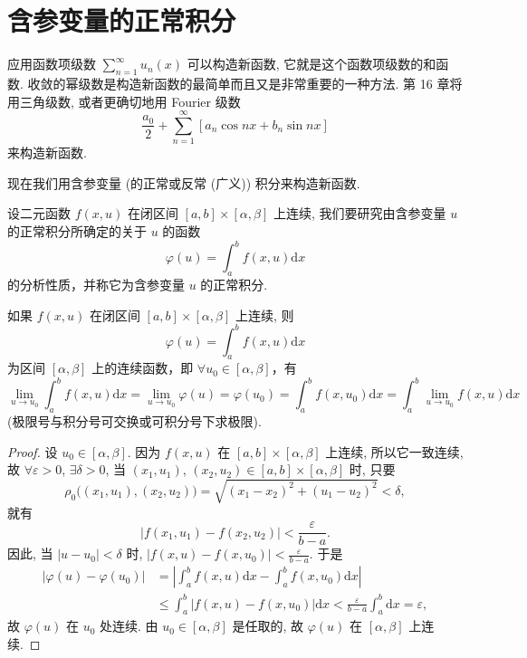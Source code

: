 \section{含参变量的正常积分}\label{sec:15.1}

应用函数项级数 $\sum_{n=1}^{\infty}u_{n}(x)$ 可以构造新函数, 它就是这个函数项级数的和函数. 收敛的幂级数是构造新函数的最简单而且又是非常重要的一种方法. 第 16 章将用三角级数, 或者更确切地用 Fourier 级数
\[
  \frac{a_{0}}{2}+\sum_{n=1}^{\infty}[a_{n}\cos nx+b_{n}\sin nx]
\]
来构造新函数.

现在我们用含参变量 (的正常或反常 (广义)) 积分来构造新函数.

\begin{definition}\label{def:15.1.1}
设二元函数 $f(x,u)$ 在闭区间 $[a,b]\times[\alpha,\beta]$ 上连续, 我们要研究由含参变量 $u$ 的正常积分所确定的关于 $u$ 的函数
\[
  \varphi(u)=\int_{a}^{b}f(x,u)\mathrm{d}x
\]
的分析性质，并称它为含参变量 $u$ 的正常积分.
\end{definition}

\begin{theorem}[含参变量正常积分保持连续性]\label{thm:15.1.1}
如果 $f(x,u)$ 在闭区间 $[a,b]\times[\alpha,\beta]$ 上连续, 则
\[
  \varphi(u)=\int_{a}^{b}f(x,u)\mathrm{d}x
\]
为区间 $[\alpha,\beta]$ 上的连续函数，即 $\forall u_{0}\in[\alpha,\beta]$，有
\[
  \lim_{u\to u_{0}}\int_{a}^{b}f(x,u)\mathrm{d}x=\lim_{u\to u_{0}}\varphi(u)=\varphi(u_{0})=\int_{a}^{b}f(x,u_{0})\mathrm{d}x=\int_{a}^{b}\lim_{u\to u_{0}}f(x,u)\mathrm{d}x
\]
(极限号与积分号可交换或可积分号下求极限).
\end{theorem}

\begin{proof}
设 $u_{0}\in[\alpha,\beta]$. 因为 $f(x,u)$ 在 $[a,b]\times[\alpha,\beta]$ 上连续, 所以它一致连续, 故 $\forall\varepsilon>0$, $\exists\delta>0$, 当 $(x_{1},u_{1})$, $(x_{2},u_{2})\in[a,b]\times[\alpha,\beta]$ 时, 只要
\[
  \rho_{0}\big((x_{1},u_{1}),(x_{2},u_{2})\big)=\sqrt{(x_{1}-x_{2})^{2}+(u_{1}-u_{2})^{2}}<\delta,
\]
就有
\[
  |f(x_{1},u_{1})-f(x_{2},u_{2})|<\frac{\varepsilon}{b-a}.
\]
因此, 当 $|u-u_{0}|<\delta$ 时, $|f(x,u)-f(x,u_{0})|<\frac{\varepsilon}{b-a}$. 于是
\[
  \begin{aligned}
    |\varphi(u)-\varphi(u_{0})|&=\left|\int_{a}^{b}f(x,u)\mathrm{d}x-\int_{a}^{b}f(x,u_{0})\mathrm{d}x\right|\\
    &\leqslant\int_{a}^{b}|f(x,u)-f(x,u_{0})|\mathrm{d}x<\frac{\varepsilon}{b-a}\int_{a}^{b}\mathrm{d}x=\varepsilon,
  \end{aligned}
\]
故 $\varphi(u)$ 在 $u_{0}$ 处连续. 由 $u_{0}\in[\alpha,\beta]$ 是任取的, 故 $\varphi(u)$ 在 $[\alpha,\beta]$ 上连续.
\end{proof}

